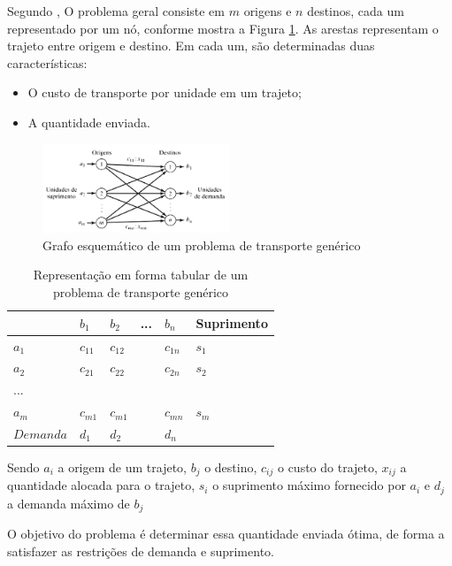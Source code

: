 \documentclass [11pt]{articleSBPO}
\begin{document}
Segundo \cite{taha}, O problema geral consiste em $m$ origens e $n$ destinos, cada um representado por um nó, conforme mostra a Figura \ref{fig:grafotransporte}. As arestas representam o trajeto entre origem e destino. Em cada um, são determinadas duas características:

\begin{itemize}
	\item O custo de transporte por unidade em um trajeto;
	\item A quantidade enviada.
\end{itemize}

\begin{figure}[!h]
	\centering
	\includegraphics[width=0.5\textwidth]{img/grafotransporte.png}
	\caption[]{Grafo esquemático de um problema de transporte genérico}
	\label{fig:grafotransporte}
\end{figure}

\begin{table}[]
	\centering
	\caption[]{Representação em forma tabular de um problema de transporte genérico}
	\label{fig:tabelatransporte}
	\begin{tabular}{ l | l  l  l  l | l }
				& $b_{1}$ 	& $b_{2}$ 	& ... & $b_{n}$  & Suprimento\\
				\hline
	$a_{1}$		& $c_{11}$ 	& $c_{12}$	&  	  & $c_{1n}$ & $s_{1}$\\
	$a_{2}$		& $c_{21}$ 	& $c_{22}$	&  	  & $c_{2n}$ & $s_{2}$\\
	...			&  &  &  &  & \\
	$a_{m}$		& $c_{m1}$ 	& $c_{m1}$	&  	  & $c_{mn}$ & $s_{m}$\\
				\hline
	$Demanda$	& $d_{1}$ 	& $d_{2}$ 	& 	  & $d_{n}$	 & \\
	\end{tabular}
\end{table}

Sendo $a_{i}$ a origem de um trajeto, $b_{j}$ o destino, $c_{ij}$ o custo do trajeto, $x_{ij}$ a quantidade alocada para o trajeto, $s_{i}$ o suprimento máximo fornecido por $a_{i}$ e $d_{j}$ a demanda máximo de $b_{j}$

O objetivo do problema é determinar essa quantidade enviada ótima, de forma a satisfazer as restrições de demanda e suprimento.
\end{document}
